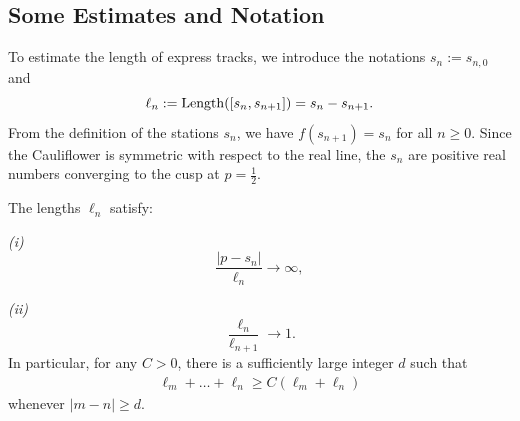 \subsection{Some Estimates and Notation}

To estimate the length of express tracks, we introduce the notations $s_n := s_{n, 0}$ and 
\begin{equation}
	\ell_n := \operatorname{Length}([s_{n},s_{n+1}]) = s_{n}-s_{n+1}.
\end{equation}
From the definition of the stations $s_n$, we have $f(s_{n+1}) = s_n$ for all $n \ge 0$. Since the Cauliflower is symmetric with respect to the real line, the $s_n$ are positive real numbers converging to the cusp at $p = \frac{1}{2}$.

\begin{lemma} \label{lem-ell_n}
	The lengths ${\ell_n}$ satisfy:
	
	{\em (i)}
	\begin{equation}
	\label{eq:ell_n1}
		\frac {|p-s_n|}{\ell_n} \to \infty,
	\end{equation}
	
	{\em (ii)}
	\begin{equation}
	\label{eq:ell_n2}
		\frac{\ell_n}{\ell_{n+1}} \to 1.
	\end{equation}
	In particular, for any $C > 0$, there is a sufficiently large integer $d$ such that
	\begin{align*}
		\ell_{m}+\ldots+\ell_{n} \geq C (\ell_m+\ell_n)
	\end{align*}
	whenever $|m-n| \geq d$.
\end{lemma}

